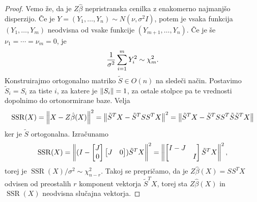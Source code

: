 \begin{proof}
  Vemo že, da je $Z \hat{\beta}$ nepristranska cenilka z enakomerno najmanjšo
  disperzijo.
  Če je $Y = (Y_1, \ldots, Y_n) \sim N(\nu, \sigma^2 I)$, potem je vsaka
  funkcija $(Y_1, \ldots, Y_m)$ neodvisna od vsake funkcije $(Y_{m+1}, \ldots,
  Y_n)$.
  Če je še $\nu_1 = \cdots = \nu_m = 0$, je
  \[
	\frac{1}{\sigma^2} \sum_{i=1}^m Y_i^2 \sim \chi_m^2.
  \]
  Konstruirajmo ortogonalno matriko $\tilde{S} \in O(n)$ na sledeči način.
  Postavimo $\tilde{S}_i = S_i$ za tiste $i$, za katere je $\left\lVert S_i\right\rVert = 1$, za
  ostale stolpce pa te vrednosti dopolnimo do ortonormirane baze.
  Velja
  \[
	\operatorname{SSR}(X)
	= \left\lVert X - Z \hat{\beta}(X)\right\rVert^2
	= \left\lVert\tilde{S}^T X - \tilde{S}^T S S^T X\right\rVert^2
	= \left\lVert\tilde{S}^T X - \tilde{S}^T S S^T \tilde{S} \tilde{S}^T X\right\rVert
  \]
  ker je $\tilde{S}$ ortogonalna.
  Izračunamo
  \[
	\operatorname{SSR}(X)
	= \left\lVert (I -
	  \begin{bmatrix}
		J \\ 0
	  \end{bmatrix}
	  \begin{bmatrix}
		J & 0
	  \end{bmatrix}
	  ) \tilde{S}^T X \right\rVert^2
	= \left\lVert
	  \begin{bmatrix}
		I-J & \\ & I
	  \end{bmatrix}
	  \tilde{S}^T X
	\right\rVert^2,
  \]
  torej je $\operatorname{SSR}(X) / \sigma^2 \sim \chi_{n-r}^2$.
  Takoj se prepričamo, da je $Z \hat{\beta}(X) = S S^T X$ odvisen od preostalih
  $r$ komponent vektorja $\tilde{S}^T X$, torej sta $Z \hat{\beta}(X)$ in
  $\operatorname{SSR}(X)$ neodvisna slučajna vektorja.
\end{proof}

